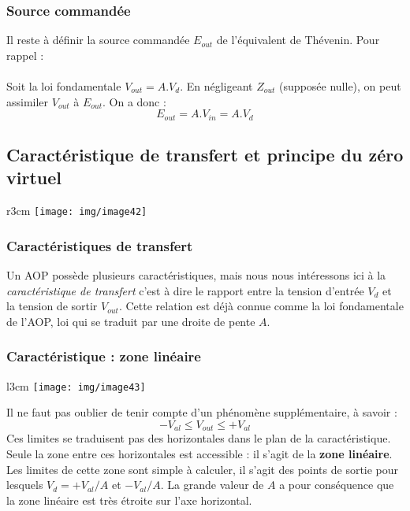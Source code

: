 
\subsubsection{Source commandée}
Il reste à définir la source commandée $E_{out}$ de l'équivalent de Thévenin. Pour rappel :\\

\ \\

Soit la loi fondamentale $V_{out} = A.V_d$. En négligeant $Z_{out}$ (supposée nulle), on peut assimiler $V_{out}$ à $E_{out}$. On a donc : 
\begin{equation}
	E_{out} = A.V_{in} = A.V_d
\end{equation}

\subsection{Caractéristique de transfert et principe du zéro virtuel}\begin{wrapfigure}[6]{r}{3cm}
\texttt{[image: img/image42]}
\end{wrapfigure}
\subsubsection{Caractéristiques de transfert}

Un AOP possède plusieurs caractéristiques, mais nous nous intéressons ici à la \textit{caractéristique de transfert} c'est à dire le rapport entre la tension d'entrée $V_d$ et la tension de sortir $V_{out}$. Cette relation est déjà connue comme la loi fondamentale de l'AOP, loi qui se traduit par une droite de pente $A$.

\subsubsection{Caractéristique : zone linéaire}
\begin{wrapfigure}[8]{l}{3cm}
	\texttt{[image: img/image43]}
\end{wrapfigure}
Il ne faut pas oublier de tenir compte d'un phénomène supplémentaire, à savoir :
\begin{equation}
	-V_{al} \leq V_{out} \leq +V_{al}
\end{equation}
Ces limites se traduisent pas des horizontales dans le plan de la caractéristique. Seule la zone entre ces horizontales est accessible : il s'agit de la \textbf{zone linéaire}.\\
Les limites de cette zone sont simple à calculer, il s'agit des points de sortie pour lesquels $V_{d} = +V_{al}/A$ et $-V_{al}/A$. La grande valeur de $A$ a pour conséquence que la zone linéaire est très étroite sur l'axe horizontal.

